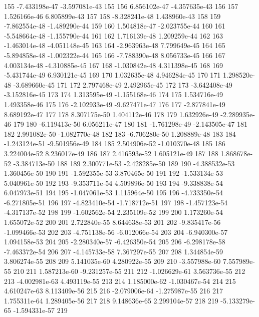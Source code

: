\documentclass{article}
\begin{document}
\begin{Schunk}
\begin{Soutput}
155   -7.433198e-47  -3.597081e-43  155
156    6.856102e-47  -4.357635e-43  156
157    1.526166e-46   6.805899e-43  157
158   -8.328241e-48   1.438960e-43  158
159   -7.862554e-48  -1.489290e-44  159
160    1.504818e-47  -2.023755e-44  160
161   -5.548664e-48  -1.155790e-44  161
162    1.716139e-48   1.209259e-44  162
163   -1.463014e-48  -4.051148e-45  163
164   -2.963963e-48   7.799649e-45  164
165   -5.894858e-48  -1.002322e-44  165
166   -7.788390e-48   8.056733e-45  166
167    4.003134e-48  -4.310885e-45  167
168   -1.030842e-48   4.311398e-45  168
169   -5.431744e-49   6.930121e-45  169
170    1.032635e-48   4.946284e-45  170
171    1.298520e-48  -3.689660e-45  171
172    2.797468e-49   2.492965e-45  172
173   -3.642408e-49  -3.152816e-45  173
174    1.313595e-49  -1.155168e-46  174
175    1.534716e-49   1.493358e-46  175
176   -2.102933e-49  -9.627471e-47  176
177   -2.877841e-49   8.689192e-47  177
178    8.307175e-50   1.404112e-46  178
179    1.632926e-49  -2.289935e-46  179
180   -6.119413e-50   6.056211e-47  180
181   -1.761298e-49  -2.143505e-47  181
182    2.991082e-50  -1.082770e-48  182
183   -6.706280e-50   1.208889e-48  183
184   -1.243124e-51  -9.501956e-49  184
185    2.504906e-52  -1.010370e-48  185
186    3.224004e-52   8.236017e-49  186
187    2.416593e-52   1.605121e-49  187
188    1.868678e-52  -3.384713e-50  188
189    2.300771e-53  -2.428285e-50  189
190   -4.388532e-53   1.360456e-50  190
191   -1.592355e-53   3.870465e-50  191
192   -1.533134e-53   5.040961e-50  192
193   -9.353711e-54   4.509896e-50  193
194   -9.338838e-54   6.047973e-51  194
195   -1.047061e-53   1.115964e-50  195
196   -4.733350e-54  -6.271805e-51  196
197   -4.823410e-54  -1.718712e-51  197
198   -1.457123e-54  -4.317137e-52  198
199   -1.602562e-54   2.235109e-52  199
200    1.173260e-54   1.655072e-52  200
201    2.722840e-55   8.644638e-53  201
202   -9.835417e-56  -1.099466e-53  202
203   -4.751138e-56  -6.012066e-54  203
204   -6.940300e-57   1.094158e-53  204
205   -2.280340e-57  -6.426350e-54  205
206   -6.298178e-58  -7.463372e-54  206
207   -4.145733e-58   7.367297e-55  207
208    1.344854e-59   3.806274e-55  208
209    5.141035e-60   4.280922e-55  209
210   -3.557988e-60   7.557989e-55  210
211    1.587213e-60  -9.231257e-55  211
212   -1.026629e-61   3.563736e-55  212
213   -4.002981e-63   4.493119e-55  213
214    1.185000e-62  -1.030467e-54  214
215    4.610247e-63   8.113409e-56  215
216   -2.079006e-64  -1.275987e-55  216
217    1.755311e-64   1.289405e-56  217
218    9.148636e-65   2.299104e-57  218
219   -5.133279e-65  -1.594331e-57  219

\end{Soutput}
\end{Schunk}
\end{document}
